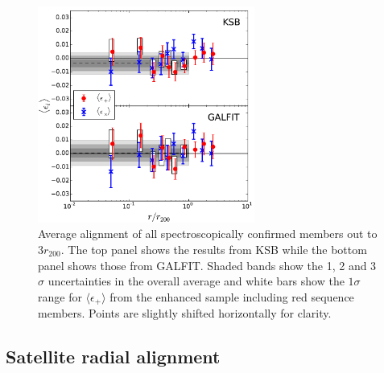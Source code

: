\begin{figure}
\begin{minipage}[b]{2.8in}
 \centerline{\includegraphics[width=2.8in]{chapter4/shear-spec-rnorm-logbins.pdf}}
\end{minipage}
\begin{minipage}[b]{2in}
\caption{Average alignment of all spectroscopically confirmed members out to $3r_{200}$. The 
top panel shows the results from KSB while the bottom panel shows those from 
GALFIT. Shaded bands show the 1, 2 and 3$\sigma$ uncertainties in the overall average and white 
bars show the $1\sigma$ range for $\langle\epsilon_+\rangle$ from the enhanced sample including red 
sequence members. Points are slightly shifted horizontally for clarity.}
\label{f:shear-all}
\end{minipage}
\end{figure}


\subsection{Satellite radial alignment}\label{s:radial}


